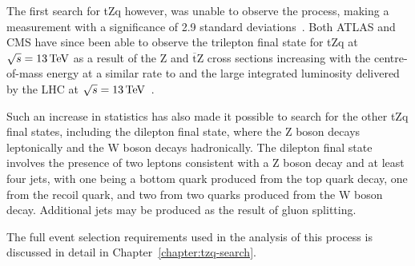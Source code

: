 The first search for tZq however, was unable to observe the process, making a measurement with a significance of 2.9 standard deviations~\cite{Sirunyan:2017kkr}.
Both ATLAS and CMS have since been able to observe the trilepton final state for tZq at $\sqrt{s} = 13\,\text{Te\hspace{-.08em}V}$ as a result of the Z and $\overline{\text{t}}$Z cross sections increasing with the centre-of-mass energy at a similar rate to \ttZ and the large integrated luminosity delivered by the LHC at $\sqrt{s} = 13\,\text{Te\hspace{-.08em}V}$~\cite{Aaboud:2017ylb,Sirunyan:2017nbr}.

Such an increase in statistics has also made it possible to search for the other tZq final states, including the dilepton final state, where the Z boson decays leptonically and the W boson decays hadronically.
The dilepton final state involves the presence of two leptons consistent with a Z boson decay and at least four jets, with one being a bottom quark produced from the top quark decay, one from the recoil quark, and two from two quarks produced from the W boson decay.
Additional jets may be produced as the result of gluon splitting.



The full event selection requirements used in the analysis of this process is discussed in detail in Chapter~\ref{chapter:tzq-search}.


